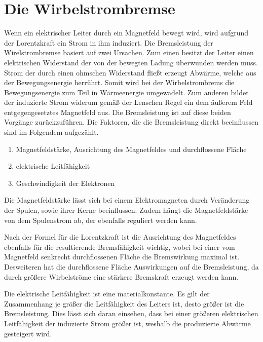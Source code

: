 



\section{Die Wirbelstrombremse}

Wenn ein elektrischer Leiter durch ein Magnetfeld bewegt wird,
wird aufgrund der Lorentzkraft ein Strom in ihm induziert.
Die Bremsleistung der Wirelstrombremse basiert auf zwei Ursachen.
Zum einen besitzt der Leiter einen elektrischen Widerstand der von der
bewegten Ladung überwunden werden muss. Strom der durch einen
ohmschen Widerstand fließt erzeugt Abwärme,
welche aus der Bewegungsenergie herrührt.
Somit wird bei der Wirbelstrombrems die Bewegungsenergie zum Teil in
Wärmeenergie umgewadelt.
Zum anderen bildet der induzierte Strom widerum gemäß der Lenschen Regel ein dem
äußerem Feld entgegengesetztes Magnetfeld aus. Die Bremsleistung
ist auf diese beiden Vorgänge zurückzuführen.
Die Faktoren, die die Bremsleistung direkt beeinflussen
sind im Folgendem aufgezählt.

\begin{enumerate}
  \item Magnetfeldstärke, Ausrichtung des Magnetfeldes und durchflossene Fläche
  \item elektrische Leitfähigkeit
  \item Geschwindigkeit der Elektronen
\end{enumerate}

Die Magnetfeldstärke lässt sich bei einem Elektromagneten durch
Veränderung der Spulen, sowie ihrer Kerne beeinflussen. Zudem hängt
die Magnetfeldstärke von dem Spulenstrom ab, der ebenfalls reguliert
werden kann.

Nach der Formel für die Lorentzkraft ist die Ausrichtung des Magnetfeldes
ebenfalls für die resultierende Bremsfähigkeit wichtig, wobei bei einer vom
Magnetfeld senkrecht durchflossenen Fläche die Bremswirkung maximal ist.
Desweiteren hat die durchflossene Fläche Auswirkungen auf die Bremsleistung,
da durch größere Wirbelströme eine stärkere Bremskraft erzeugt werden kann.

Die elektrische Leitfähigkeit ist eine materialkonstante.
Es gilt der Zusammenhang je größer die Leitfähigkeit des Leiters ist,
desto größer ist die Bremsleistung.
Dies lässt sich daran einsehen, dass bei einer größeren
elektrischen Leitfähigkeit der induzierte Strom größer ist, weshalb
die produzierte Abwärme gesteigert wird.

